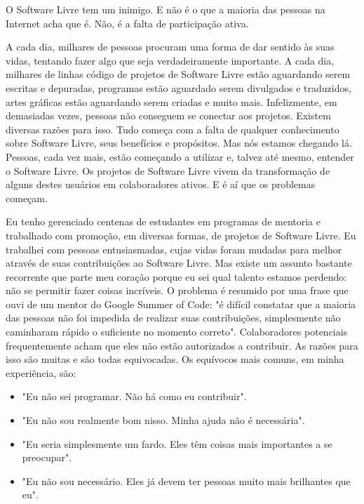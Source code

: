 

\noindent{}O Software Livre tem um inimigo. E não é o que a maioria das pessoas na Internet acha
que é. Não, é a falta de participação ativa.

A cada dia, milhares de pessoas procuram uma forma de dar sentido às suas vidas,
tentando fazer algo que seja verdadeiramente importante. A cada dia, milhares
de linhas código de projetos de Software Livre estão aguardando serem escritas e
depuradas, programas estão aguardado serem divulgados e traduzidos, artes gráficas
estão aguardando serem criadas e muito mais. Infelizmente, em demasiadas vezes, pessoas
não conseguem se conectar aos projetos. Existem diversas razões para isso. Tudo começa
com a falta de qualquer conhecimento sobre Software Livre, seus benefícios e propósitos.
Mas nós estamos chegando lá. Pessoas, cada vez mais, estão começando a utilizar e, talvez até mesmo,
entender o Software Livre. Os projetos de Software Livre vivem da transformação
de alguns destes usuários em colaboradores ativos. E é aí que os problemas começam.

Eu tenho gerenciado centenas de estudantes em programas de mentoria e trabalhado com
promoção, em diversas formas, de projetos de Software Livre. Eu trabalhei com pessoas
entusiasmadas, cujas vidas foram mudadas para melhor através de suas contribuições
ao Software Livre. Mas existe um assunto bastante recorrente que parte meu coração porque
eu sei qual talento estamos perdendo: não se permitir fazer coisas incríveis. O
problema é resumido por uma frase que ouvi de um mentor do Google Summer of Code: "é
difícil constatar que a maioria das pessoas não foi impedida de realizar suas contribuições,
simplesmente não caminharam rápido o suficiente no momento correto". Colaboradores potenciais
frequentemente acham que eles não estão autorizados a contribuir. As razões para isso são
muitas e são todas equivocadas. Os equívocos mais comuns, em minha experiência, são:

\begin{itemize}
 \item "Eu não sei programar. Não há como eu contribuir".
 \item "Eu não sou realmente bom nisso. Minha ajuda não é necessária".
 \item "Eu seria simplesmente um fardo. Eles têm coisas mais importantes a se preocupar".
 \item "Eu não sou necessário. Eles já devem ter pessoas muito mais brilhantes que eu".
\end{itemize}

